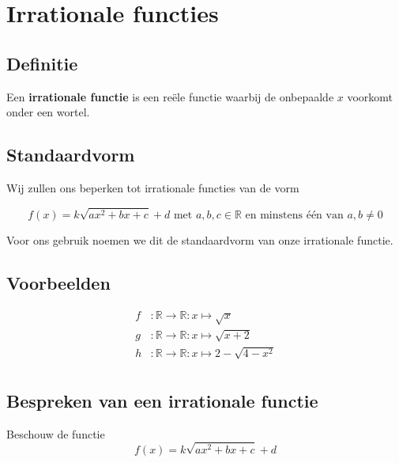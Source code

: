 \documentclass[12pt,twoside]{article}
\begin{document}
\pagebreak
\section{Irrationale functies}

\subsection{Definitie}

Een {\bf irrationale functie} is een reële functie waarbij de onbepaalde $x$ voorkomt onder een wortel.

\subsection{Standaardvorm}

Wij zullen ons beperken tot irrationale functies van de vorm

$$f(x)=k\sqrt{ax^2+bx+c} + d \mbox{ met } a,b,c \in \mathbb{R} \mbox { en minstens één van } a,b \neq 0$$

Voor ons gebruik noemen we dit de standaardvorm van onze irrationale functie.

\subsection{Voorbeelden}

\begin{align*}
 f &: \mathbb{R} \to \mathbb{R} : x \mapsto \sqrt{x}\\
 g &: \mathbb{R} \to \mathbb{R} : x \mapsto \sqrt{x+2}\\
 h &: \mathbb{R} \to \mathbb{R} : x \mapsto 2 - \sqrt{4-x^2}\\
\end{align*}

\subsection{Bespreken van een irrationale functie}

Beschouw de functie
$$f(x)=k\sqrt{ax^2+bx+c} + d$$
\end{document}
